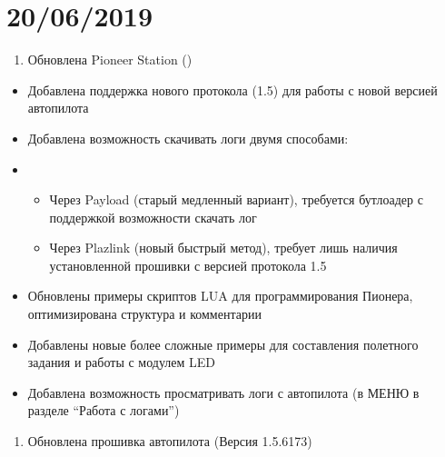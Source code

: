 \documentclass[a4paper,10pt,russian]{sphinxmanual}
\begin{document}
\section{20/06/2019}
\label{\detokenize{changelog:id1}}\begin{enumerate}
\def\theenumi{\arabic{enumi}}
\def\labelenumi{\theenumi .}
\makeatletter\def\p@enumii{\p@enumi \theenumi .}\makeatother
\item {} 
Обновлена Pioneer Station ()

\end{enumerate}
\begin{itemize}
\item {} 
Добавлена поддержка нового протокола (1.5) для работы с новой версией автопилота

\item {} 
Добавлена возможность скачивать логи двумя способами:

\item {} \begin{itemize}
\item {} 
Через Payload (старый медленный вариант), требуется бутлоадер с поддержкой возможности скачать лог

\item {} 
Через Plazlink (новый быстрый метод), требует лишь наличия установленной прошивки с версией протокола 1.5

\end{itemize}

\item {} 
Обновлены примеры скриптов LUA для программирования Пионера, оптимизирована структура и комментарии

\item {} 
Добавлены новые более сложные примеры для составления полетного задания и работы с модулем LED

\item {} 
Добавлена возможность просматривать логи с автопилота (в МЕНЮ в разделе “Работа с логами”)

\end{itemize}
\begin{enumerate}
\def\theenumi{\arabic{enumi}}
\def\labelenumi{\theenumi .}
\makeatletter\def\p@enumii{\p@enumi \theenumi .}\makeatother
\setcounter{enumi}{1}
\item {} 
Обновлена прошивка автопилота (Версия 1.5.6173)

\end{enumerate}
\end{document}
